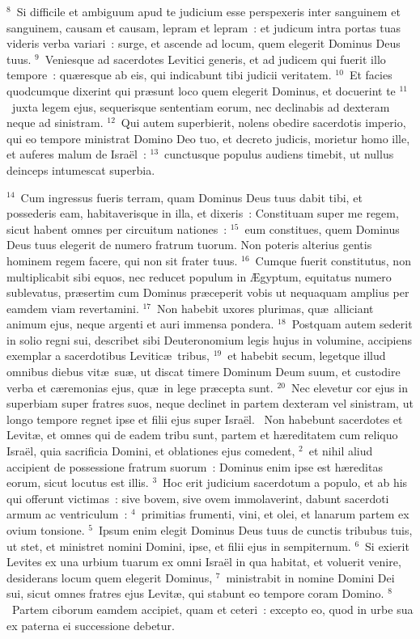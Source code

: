 ${}^{8}$~Si difficile et ambiguum apud te judicium esse perspexeris inter sanguinem et sanguinem, causam et causam, lepram et lepram~: et judicum intra portas tuas videris verba variari~: surge, et ascende ad locum, quem elegerit Dominus Deus tuus.
${}^{9}$~Veniesque ad sacerdotes Levitici generis, et ad judicem qui fuerit illo tempore~: qu\ae resque ab eis, qui indicabunt tibi judicii veritatem.
${}^{10}$~Et facies quodcumque dixerint qui pr\ae sunt loco quem elegerit Dominus, et docuerint te
${}^{11}$~juxta legem ejus, sequerisque sententiam eorum, nec declinabis ad dexteram neque ad sinistram.
${}^{12}$~Qui autem superbierit, nolens obedire sacerdotis imperio, qui eo tempore ministrat Domino Deo tuo, et decreto judicis, morietur homo ille, et auferes malum de Isra\"el~:
${}^{13}$~cunctusque populus audiens timebit, ut nullus deinceps intumescat superbia.


${}^{14}$~Cum ingressus fueris terram, quam Dominus Deus tuus dabit tibi, et possederis eam, habitaverisque in illa, et dixeris~: Constituam super me regem, sicut habent omnes per circuitum nationes~:
${}^{15}$~eum constitues, quem Dominus Deus tuus elegerit de numero fratrum tuorum. Non poteris alterius gentis hominem regem facere, qui non sit frater tuus.
${}^{16}$~Cumque fuerit constitutus, non multiplicabit sibi equos, nec reducet populum in \AE gyptum, equitatus numero sublevatus, pr\ae sertim cum Dominus pr\ae ceperit vobis ut nequaquam amplius per eamdem viam revertamini.
${}^{17}$~Non habebit uxores plurimas, qu\ae\ alliciant animum ejus, neque argenti et auri immensa pondera.
${}^{18}$~Postquam autem sederit in solio regni sui, describet sibi Deuteronomium legis hujus in volumine, accipiens exemplar a sacerdotibus Levitic\ae\ tribus,
${}^{19}$~et habebit secum, legetque illud omnibus diebus vit\ae\ su\ae , ut discat timere Dominum Deum suum, et custodire verba et c\ae remonias ejus, qu\ae\ in lege pr\ae cepta sunt.
${}^{20}$~Nec elevetur cor ejus in superbiam super fratres suos, neque declinet in partem dexteram vel sinistram, ut longo tempore regnet ipse et filii ejus super Isra\"el.
~Non habebunt sacerdotes et Levit\ae , et omnes qui de eadem tribu sunt, partem et h\ae reditatem cum reliquo Isra\"el, quia sacrificia Domini, et oblationes ejus comedent,
${}^{2}$~et nihil aliud accipient de possessione fratrum suorum~: Dominus enim ipse est h\ae reditas eorum, sicut locutus est illis.
${}^{3}$~Hoc erit judicium sacerdotum a populo, et ab his qui offerunt victimas~: sive bovem, sive ovem immolaverint, dabunt sacerdoti armum ac ventriculum~:
${}^{4}$~primitias frumenti, vini, et olei, et lanarum partem ex ovium tonsione.
${}^{5}$~Ipsum enim elegit Dominus Deus tuus de cunctis tribubus tuis, ut stet, et ministret nomini Domini, ipse, et filii ejus in sempiternum.
${}^{6}$~Si exierit Levites ex una urbium tuarum ex omni Isra\"el in qua habitat, et voluerit venire, desiderans locum quem elegerit Dominus,
${}^{7}$~ministrabit in nomine Domini Dei sui, sicut omnes fratres ejus Levit\ae , qui stabunt eo tempore coram Domino.
${}^{8}$~Partem ciborum eamdem accipiet, quam et ceteri~: excepto eo, quod in urbe sua ex paterna ei successione debetur.


